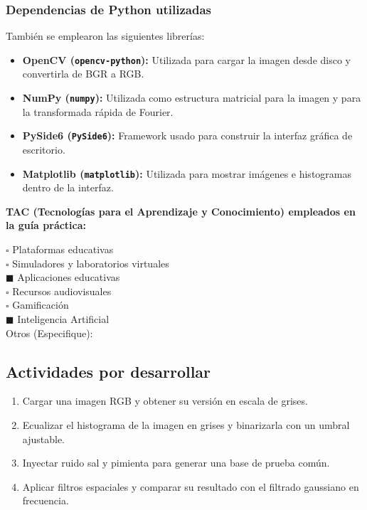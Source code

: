\documentclass[11pt]{article}
\begin{document}
\subsubsection*{Dependencias de Python utilizadas}
También se emplearon las siguientes librerías:
\begin{itemize}
    \item \textbf{OpenCV (\texttt{opencv-python}):} Utilizada para cargar la imagen desde disco y convertirla de BGR a RGB.
    \item \textbf{NumPy (\texttt{numpy}):} Utilizada como estructura matricial para la imagen y para la transformada rápida de Fourier.
    \item \textbf{PySide6 (\texttt{PySide6}):} Framework usado para construir la interfaz gráfica de escritorio.
    \item \textbf{Matplotlib (\texttt{matplotlib}):} Utilizada para mostrar imágenes e histogramas dentro de la interfaz.
\end{itemize}

\textbf{TAC (Tecnologías para el Aprendizaje y Conocimiento) empleados en la guía práctica:}

$\square$ Plataformas educativas \\
$\square$ Simuladores y laboratorios virtuales \\
$\blacksquare$ Aplicaciones educativas \\
$\square$ Recursos audiovisuales \\
$\square$ Gamificación \\
$\blacksquare$ Inteligencia Artificial \\
Otros (Especifique): \underline{\hspace{5cm}}

\subsection{Actividades por desarrollar}
\begin{enumerate}
    \item Cargar una imagen RGB y obtener su versión en escala de grises.
    \item Ecualizar el histograma de la imagen en grises y binarizarla con un umbral ajustable.
    \item Inyectar ruido sal y pimienta para generar una base de prueba común.
    \item Aplicar filtros espaciales y comparar su resultado con el filtrado gaussiano en frecuencia.
\end{enumerate}
\end{document}
